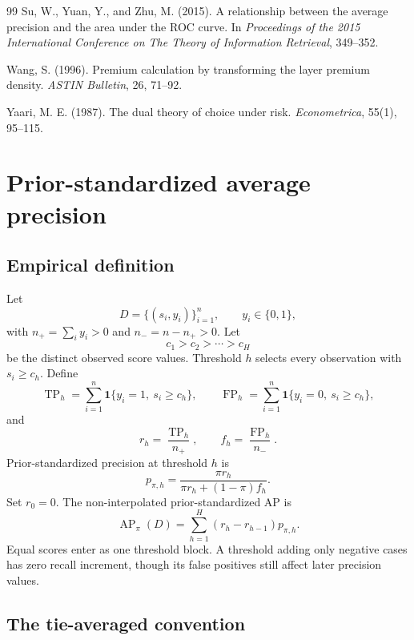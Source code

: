 \documentclass[11pt]{article}
\newcommand{\AP}{\operatorname{AP}}
\theoremstyle{remark}
\begin{document}
\begin{thebibliography}{99}
Su, W., Yuan, Y., and Zhu, M. (2015).
A relationship between the average precision and the area under the ROC curve.
In \emph{Proceedings of the 2015 International Conference on The Theory of Information Retrieval}, 349--352.

Wang, S. (1996).
Premium calculation by transforming the layer premium density.
\emph{ASTIN Bulletin}, 26, 71--92.

Yaari, M. E. (1987).
The dual theory of choice under risk.
\emph{Econometrica}, 55(1), 95--115.

\end{thebibliography}

\appendix

\section{Prior-standardized average precision}
\label{app:ap-definition}

\subsection{Empirical definition}

Let
\[
D=\{(s_i,y_i)\}_{i=1}^{n},
\qquad
y_i\in\{0,1\},
\]
with $n_+=\sum_i y_i>0$ and $n_-=n-n_+>0$. Let
\[
c_1>c_2>\cdots>c_H
\]
be the distinct observed score values. Threshold $h$ selects every observation with $s_i\geq c_h$. Define
\[
\operatorname{TP}_h
=
\sum_{i=1}^{n}
\mathbf{1}\{y_i=1,\ s_i\geq c_h\},
\qquad
\operatorname{FP}_h
=
\sum_{i=1}^{n}
\mathbf{1}\{y_i=0,\ s_i\geq c_h\},
\]
and
\[
r_h=\frac{\operatorname{TP}_h}{n_+},
\qquad
f_h=\frac{\operatorname{FP}_h}{n_-}.
\]
Prior-standardized precision at threshold $h$ is
\[
p_{\pi,h}
=
\frac{\pi r_h}
{\pi r_h+(1-\pi)f_h}.
\]
Set $r_0=0$. The non-interpolated prior-standardized AP is
\begin{equation}
\AP_\pi(D)
=
\sum_{h=1}^{H}
(r_h-r_{h-1})p_{\pi,h}.
\label{eq:empirical-ap}
\end{equation}
Equal scores enter as one threshold block. A threshold adding only negative cases has zero recall increment, though its false positives still affect later precision values.

\subsection{The tie-averaged convention}
\label{app:tie-convention}
\end{document}
